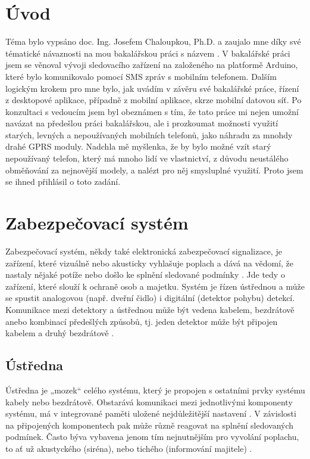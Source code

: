\documentclass[FM,MP]{tulthesis}  %
\begin{document}

\chapter{Úvod}
Téma bylo vypsáno doc. Ing. Josefem Chaloupkou, Ph.D. a zaujalo mne díky své tématické návaznosti na mou bakalářskou práci s názvem  \cite{Bachelor thesis}. V bakalářské práci jsem se věnoval vývoji sledovacího zařízení na založeného na platformě Arduino, které bylo komunikovalo pomocí SMS zpráv s mobilním telefonem. Dalším logickým krokem pro mne bylo, jak uvádím v závěru své bakalářské práce, řízení z desktopové aplikace, případně z mobilní aplikace, skrze mobilní datovou síť. Po konzultaci s vedoucím jsem byl obeznámen s tím, že tato práce mi nejen umožní navázat na předešlou práci bakalářskou, ale i prozkoumat možnosti využití starých, levných a nepoužívaných mobilních telefonů, jako náhradu za mnohdy drahé GPRS moduly. Nadchla mě myšlenka, že by bylo možné vzít starý nepoužívaný telefon, který má mnoho lidí ve vlastnictví, z důvodu neustálého obměňování za nejnovější modely, a nalézt pro něj smysluplné využití. Proto jsem se ihned přihlásil o toto zadání.

\chapter{Zabezpečovací systém}
Zabezpečovací systém, někdy také elektronická zabezpečovací signalizace, je zařízení, které vizuálně nebo akusticky vyhlašuje poplach a dává na vědomí, že nastaly nějaké potíže nebo došlo ke splnění sledované podmínky \cite{Security alarm}. Jde tedy o zařízení, které slouží k ochraně osob a majetku. Systém je řízen ústřednou a může se spustit analogovou (např. dveřní čidlo) i digitální (detektor pohybu) detekcí. Komunikace mezi detektory a ústřednou může být vedena kabelem, bezdrátově anebo kombinací předešlých způsobů, tj. jeden detektor může být připojen kabelem a druhý bezdrátově \cite{Electronic security system}.

\section{Ústředna}
Ústředna je „mozek“ celého systému, který je propojen s ostatními prvky systému kabely nebo bezdrátově. Obstarává komunikaci mezi jednotlivými komponenty systému, má v integrované paměti uložené nejdůležitější nastavení \cite{Electronic security system}. V závislosti na připojených komponentech pak může různě reagovat na splnění sledovaných podmínek. Často býva vybavena jenom tím nejnutnějším pro vyvolání poplachu, to ať už akustyckého (siréna), nebo tichého (informování majitele) \cite{Security alarm}.
\end{document}
